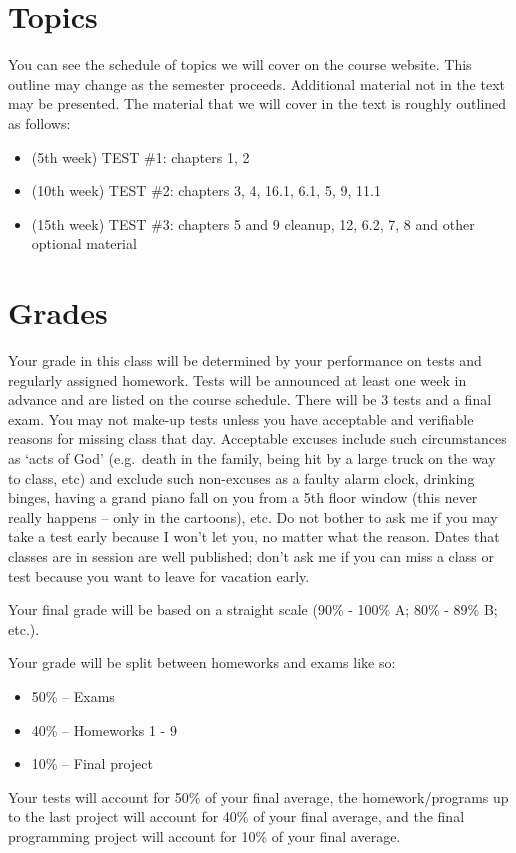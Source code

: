 \documentclass{article}
\begin{document}
\section{Topics}
You can see the schedule of topics we will cover on the course website.
This outline may change as the semester proceeds.
Additional material not in the text may be presented.
The material that we will cover in the text is roughly outlined as follows:
\begin{itemize}
	\item (5th week) TEST \#1: chapters 1, 2
	\item (10th week) TEST \#2: chapters 3, 4, 16.1, 6.1, 5, 9, 11.1
	\item (15th week) TEST \#3: chapters 5 and 9 cleanup, 12, 6.2, 7, 8 and other optional material
\end{itemize}

\section{Grades}
Your grade in this class will be determined by your performance on tests and regularly assigned homework.
Tests will be announced at least one week in advance and are listed on the course schedule.
There will be 3 tests and a final exam.
You may not make-up tests unless you have acceptable and verifiable reasons for missing class that day.
Acceptable excuses include such circumstances as `acts of God' (e.g.\ death in the family, being hit by a large truck on the way to class, etc) and exclude such non-excuses as a faulty alarm clock, drinking binges, having a grand piano fall on you from a 5th floor window (this never really happens -- only in the cartoons), etc.
Do not bother to ask me if you may take a test early because I won't let you, no matter what the reason.
Dates that classes are in session are well published; don't ask me if you can miss a class or test because you want to leave for vacation early.

Your final grade will be based on a straight scale (90\% - 100\%  A;  80\% - 89\%  B; etc.).

Your grade will be split between homeworks and exams like so:
\begin{itemize}
	\item 50\% -- Exams
	\item 40\% -- Homeworks 1 - 9
	\item 10\% -- Final project
\end{itemize}

Your tests will account for 50\% of your final average, the homework/programs up to the last project will account for 40\% of your final average, and the final programming project will account for 10\% of your final average.
\end{document}
